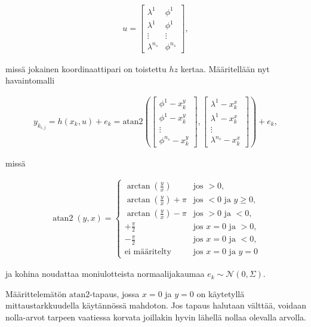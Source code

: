 \documentclass[
  12pt,
  a4paper, twoside]{book}
\begin{document}
\begin{align}
u=\begin{bmatrix} \lambda^1 & \phi^1 \\  \lambda^1 & \phi^1 \\  \vdots & \vdots \\ \lambda^{n_s} & \phi^{n_s} \end{bmatrix},
\end{align}

\noindent missä jokainen koordinaattipari on toistettu \(hz\) kertaa. Määritellään nyt havaintomalli

\begin{align}\label{havaintomalli}
y_{k_{i,j}}=h(x_k, u)+e_k=\text{atan2}(\begin{bmatrix}\phi^1-x_k^y\\ \phi^1-x_k^y\\ \vdots \\ \phi^{n_s}-x_k^y\end{bmatrix}, \begin{bmatrix}\lambda^1-x_k^x\\ \lambda^1-x_k^x\\ \vdots \\ \lambda^{n_s}-x_k^x\end{bmatrix})+e_k,
\end{align}

\noindent missä

\begin{align}\label{atan2}
\displaystyle \operatorname{atan2}(y,x)={\begin{cases}\arctan({\frac {y}{x}})&{\text{jos }}>0,\\\arctan({\frac {y}{x}})+\pi &{\text{jos }}<0{\text{ ja }}y\geq 0,\\\arctan({\frac {y}{x}})-\pi & {\text{jos }}>0{\text{ ja }}<0,\\+{\frac {\pi }{2}}&{\text{jos }}x=0{\text{ ja }}>0,\\-{\frac {\pi }{2}}&{\text{jos }}x=0{\text{ ja }}<0,\\{\text{ei määritelty}}&{\text{jos }}x=0{\text{ ja }}y=0\end{cases}}
\end{align}

\noindent ja kohina noudattaa moniulotteista normaalijakaumaa \(e_k\sim\mathcal{N}(0,{\Sigma})\).

Määrittelemätön \(\text{atan2}\)-tapaus, jossa \(x=0\) ja \(y=0\) on käytetyllä mittaustarkkuudella käytännössä mahdoton. Jos tapaus halutaan välttää, voidaan nolla-arvot tarpeen vaatiessa korvata joillakin hyvin lähellä nollaa olevalla arvolla.
\end{document}
